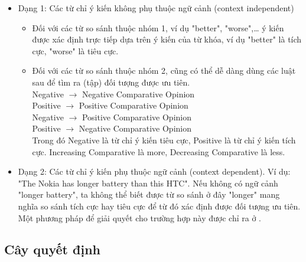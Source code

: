 \documentclass[12pt]{extarticle}
\begin{document}
				\begin{itemize}
				\item{Dạng 1: Các từ chỉ ý kiến không phụ thuộc ngữ cảnh (context independent)
					\begin{itemize}
						\item{Đối với các từ so sánh thuộc nhóm 1, ví dụ "better", "worse",… ý kiến được xác định trực tiếp dựa trên ý kiến của từ khóa, ví dụ "better" là tích cực, "worse" là tiêu cực.}
						\item{Đối với các từ so sánh thuộc nhóm 2, cũng có thể dễ dàng dùng các luật sau để tìm ra (tập) đối tượng được ưu tiên.				
							\\<Increasing Comparative> Negative $\rightarrow$ Negative Comparative Opinion
							\\<Increasing Comparative> Positive $\rightarrow$ Positive Comparative Opinion
							\\<Decreasing Comparative> Negative $\rightarrow$ Positive Comparative Opinion
							\\<Decreasing Comparative> Positive $\rightarrow$ Negative Comparative Opinion
							\\Trong đó Negative là từ chỉ ý kiến tiêu cực, Positive là từ chỉ ý kiến tích cực. Increasing Comparative là more, Decreasing Comparative là less.}
					\end{itemize}}
				\item{Dạng 2: Các từ chỉ ý kiến phụ thuộc ngữ cảnh (context dependent). Ví dụ: "The Nokia has longer battery than this HTC". Nếu không có ngữ cảnh "longer battery", ta không thể biết được từ so sánh ở đây "longer" mang nghĩa so sánh tích cực hay tiêu cực để từ đó xác định được đối tượng ưu tiên. Một phương pháp để giải quyết cho trường hợp này được chỉ ra ở \cite{comparative2}.}
				\end{itemize}
		\subsection{Cây quyết định}
\end{document}
